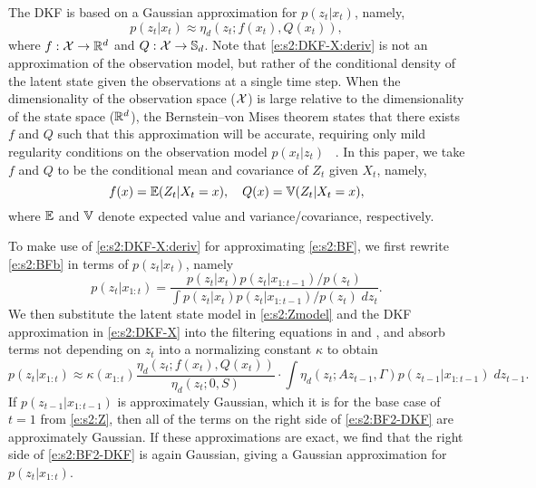 The DKF is based on a Gaussian approximation for $p(z_t|x_t)$, namely,
\begin{equation} 
\label{e:s2:DKF-X:deriv} p(z_t|x_t) \approx \eta_d(z_t;f(x_t),Q(x_t)) ,
\end{equation}
where $f:{\cal{X}}\to\RR^d$ and $Q:{\cal{X}}\to\SS_d$. Note that \eqref{e:s2:DKF-X:deriv} is not an approximation of the observation model, but rather of the conditional density of the latent state given the observations at a single time step. When the dimensionality of the observation space (${\cal{X}}$) is large relative to the dimensionality of the state space ($\RR^d$), the Bernstein--von Mises theorem states that there exists $f$ and $Q$ such that this approximation will be accurate, requiring only mild regularity conditions on the observation model $p(x_t|z_t)$ ~\cite[see Section~\ref{s:BVM} and][]{vdV98}. In this paper, we take $f$ and $Q$ to be the conditional mean and covariance of $Z_t$ given $X_t$, namely,
\begin{equation} \label{e:s2:fQ:deriv} f(x)=\Exp(Z_t|X_t=x), \quad Q(x)=\var(Z_t|X_t=x) , \end{equation}
where $\Exp$ and $\var$ denote expected value and variance/covariance, respectively.

To make use of \eqref{e:s2:DKF-X:deriv} for approximating \eqref{e:s2:BF}, we first rewrite \eqref{e:s2:BFb} in terms of $p(z_t|x_t)$, namely
\begin{equation} \label{e:s2:BF2}
p(z_t|x_{1:t}) = \frac{p(z_t|x_t)p(z_t|x_{1:t-1})/p(z_t)}{\int p(z_t|x_t) p(z_t|x_{1:t-1})/p(z_t) \; dz_t} . 
\end{equation}
We then substitute the latent state model in \eqref{e:s2:Zmodel} and the DKF approximation in \eqref{e:s2:DKF-X} into the filtering equations in  and , and absorb terms not depending on $z_t$ into a normalizing constant $\kappa$ to obtain
\begin{equation} \label{e:s2:BF2-DKF}
p(z_t|x_{1:t}) \approx \kappa(x_{1:t})\frac{\eta_d(z_t;f(x_t),Q(x_t))}{\eta_d(z_t;0,S)} \cdot \textstyle \int \eta_d(z_t;Az_{t-1},\Gamma) p(z_{t-1}|x_{1:t-1}) \; dz_{t-1} .
\end{equation}
If $p(z_{t-1}|x_{1:t-1})$ is approximately Gaussian, which it is for the base case of $t=1$ from \eqref{e:s2:Z}, then all of the terms on the right side of \eqref{e:s2:BF2-DKF} are approximately Gaussian. If these approximations are exact, we find that the right side of \eqref{e:s2:BF2-DKF} is again Gaussian, giving a Gaussian approximation for $p(z_t|x_{1:t})$. 

